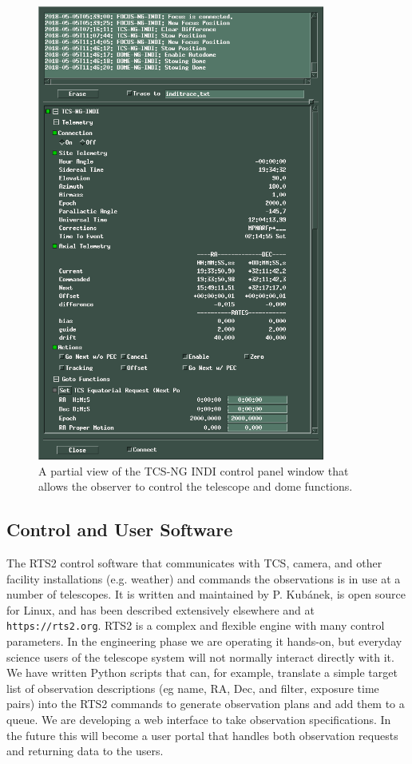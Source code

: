 \documentclass[]{spie}  %
\begin{document}
   \begin{figure} [ht]
   \begin{center}
   \includegraphics[height=15cm]{tcs_indi_panel1.png}
  \end{center}
   \caption[] 
   { \label{fig:tcs-ng} 
A partial view of the TCS-NG INDI control panel window that allows the observer
to control the telescope and dome functions.
}
  \end{figure} 

\subsection{Control and User Software}

The RTS2 control software that communicates with TCS, camera, and other facility installations (e.g. weather) and commands the observations is in use at a number of telescopes.  It is written and maintained by P. Kub\'anek, is open source for Linux, and has been described extensively elsewhere\cite{Kubanek08,Kubanek16} and at {\tt https://rts2.org}. RTS2 is a complex and flexible engine with many control parameters.  In the engineering phase we are operating it hands-on, but everyday science users of the telescope system will not normally interact directly with it.  We have written Python scripts that can,  for example, translate a simple target list of observation descriptions (eg name, RA, Dec, and filter, exposure time pairs) into the RTS2 commands to generate observation plans and add them to a queue.  We are developing a web interface to take observation specifications. In the future this will become a user portal that handles both observation requests and returning data to the users.
\end{document}
